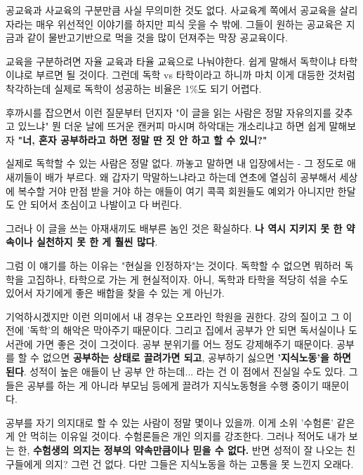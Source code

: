 \vspace{5mm}

공교육과 사교육의 구분만큼 사실 무의미한 것도 없다.
사교육계 쪽에서 공교육을 살리자라는 매우 위선적인 이야기를 하지만 피식 웃을 수 밖에.
그들이 원하는 공교육은 지금과 같이 물반고기반으로 먹을 것을 많이 던져주는 막장 공교육이다.
\vspace{5mm}

교육을 구분하려면 자율 교육과 타율 교육으로 나눠야한다.
쉽게 말해서 독학이냐 타학이냐로 부르면 될 것이다.
그런데 독학 vs 타학이라고 하니까 마치 이게 대등한 것처럼 착각하는데
실제로 독학이 성공하는 비율은 1$\%$도 되기 어렵다.
\vspace{5mm}

후까시를 잡으면서 이런 질문부터 던지자
"이 글을 읽는 사람은 정말 자유의지를 갖추고 있느냐"
뭔 더운 날에 뜨거운 캔커피 마시며 하악대는 개소리냐고 하면 쉽게 말해보자
\textbf{"너, 혼자 공부하라고 하면 정말 딴 짓 안 하고 할 수 있니?"}
\vspace{5mm}

실제로 독학할 수 있는 사람은 정말 없다. 까놓고 말하면 내 입장에서는 - 그 정도로 애새끼들이 배가 부르다.
왜 갑자기 막말하느냐라고 하는데
연초에 열심히 공부해서 세상에 복수할 거야 만점 받을 거야 하는 애들이
여기 콕콕 회원들도 예외가 아니지만 한달도 안 되어서 초심이고 나발이고 다 버린다.
\vspace{5mm}

그러나 이 글을 쓰는 아재새끼도 배부른 놈인 것은 확실하다. \textbf{나 역시 지키지 못 한 약속이나 실천하지 못 한 게 훨씬 많다}.
\vspace{5mm}

그럼 이 얘기를 하는 이유는 "현실을 인정하자"는 것이다.
독학할 수 없으면 뭐하러 독학을 고집하나, 타학으로 가는 게 현실적이자.
아니, 독학과 타학을 적당히 섞을 수도 있어서 자기에게 좋은 배합을 찾을 수 있는 게 아닌가.
\vspace{5mm}

기억하시겠지만 이런 의미에서 내 경우는 오프라인 학원을 권한다. 강의 질이고 그 이전에 '독학'의 해악은 막아주기 때문이다.
그리고 집에서 공부가 안 되면 독서실이나 도서관에 가면 좋은 것이 그것이다. 공부 분위기를 어느 정도 강제해주기 때문이다.
공부를 할 수 없으면 \textbf{공부하는 상태로 끌려가면 되고}, 공부하기 싫으면 \textbf{'지식노동'을 하면 된다}.
성적이 높은 애들이 난 공부 안 하는데... 라는 건 이 점에서 진실일 수도 있다.
그들은 공부를 하는 게 아니라 부모님 등에게 끌려가 지식노동형을 수행 중이기 때문이다.
\vspace{5mm}

공부를 자기 의지대로 할 수 있는 사람이 정말 몇이나 있을까.
이게 소위 '수험론' 같은 게 안 먹히는 이유일 것이다. 수험론들은 개인 의지를 강조한다.
그러나 적어도 내가 보는 한, \textbf{수험생의 의지는 정부의 약속만큼이나 믿을 수 없다.}
반면 성적이 잘 나오는 친구들에게 의지? 그런 건 없다. 다만 그들은 지식노동을 하는 고통을 못 느낀지 오래다.
\vspace{5mm}

